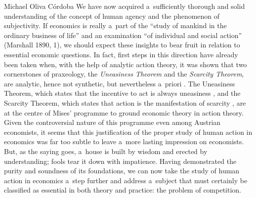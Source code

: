 \begin{artengenv}{Michael Oliva Córdoba}
We have now acquired a~sufficiently thorough and solid understanding of the concept of human agency and the phenomenon of subjectivity. If economics is really a~part of the ``study of mankind in the ordinary business of life'' and an examination ``of individual and social action'' (Marshall 1890, 1), we should expect these insights to bear fruit in relation to essential economic questions. In fact, first steps in this direction have already been taken when, with the help of analytic action theory, it was shown that two cornerstones of praxeology, the \textit{Uneasiness Theorem} and the \textit{Scarcity Theorem}, are analytic, hence not synthetic, but nevertheless a~priori 
\parencite[][]{oliva_cordoba_uneasiness_2017}. %
 The Uneasiness Theorem, which states that the incentive to act is always uneasiness 
\parencite[][p.13]{mises_human_1998}, %
 and the Scarcity Theorem, which states that action is the manifestation of scarcity 
\parencite[][p.70]{mises_human_1998}, %
 are at the centre of Mises' programme to ground economic theory in action theory. Given the controversial nature of this programme even among Austrian economists, it seems that this justification of the proper study of human action in economics was far too subtle to leave a~more lasting impression on economists. But, as the saying goes, a~house is built by wisdom and erected by understanding; fools tear it down with impatience. Having demonstrated the purity and soundness of its foundations, we can now take the study of human action in economics a~step further and address a~subject that must certainly be classified as essential in both theory and practice: the problem of competition.




\end{artengenv}
